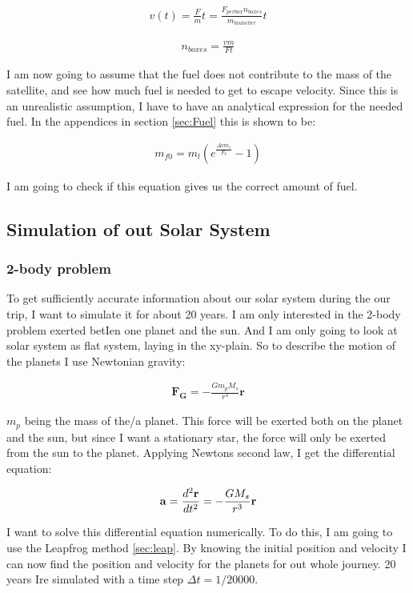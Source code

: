 \documentclass[a4paper, 10pt]{article}
\begin{document}
\begin{align}
v(t) = \frac{F}{m} t = \frac{F_{per box}n_{boxes}}{m_{launcher}} t
\end{align}

\begin{align}\label{eq:boxes}
n_{boxes} = \frac{v m}{F t}
\end{align}

I am now going to assume that the fuel does not contribute to the mass of the satellite, and see how much fuel is needed to get to escape velocity. Since this is an unrealistic assumption, I have to have an analytical expression for the needed fuel. In the appendices in section \ref{sec:Fuel} this is shown to be:

\begin{align}\label{eq:Fuel}
m_{f0} = m_l(e^{\frac{\Delta v m_e}{F_b}} - 1)
\end{align}

I am going to check if this equation gives us the correct amount of fuel.

\subsection{Simulation of out Solar System}
\subsubsection{2-body problem}
To get sufficiently accurate information about our solar system during the our trip, I want to simulate it for about 20 years. I am only interested in the 2-body problem exerted betIen one planet and the sun. And I am only going to look at solar system as flat system, laying in the xy-plain. So to describe the motion of the planets I use Newtonian gravity:

\begin{align}
\textbf{F}_\textbf{G} = -\frac{Gm_p M_s}{r^{3}}\textbf{r}
\end{align}

$m_p$ being the mass of the/a planet. This force will be exerted both on the planet and the sun, but since I want a stationary star, the force will only be exerted from the sun to the planet. Applying Newtons second law, I get the differential equation:

$$
\bold{a} = \frac{d^{2}\textbf{r}}{dt^{2}}  = -\frac{G M_s}{r^{3}}\textbf{r}
$$ 


I want to solve this differential equation numerically. To do this, I am going to use the Leapfrog method \ref{sec:leap}. By knowing the initial position and velocity I can now find the position and velocity for the planets for out whole journey. 20 years Ire simulated with a time step $\Delta t = 1/20000.$\\
\end{document}
